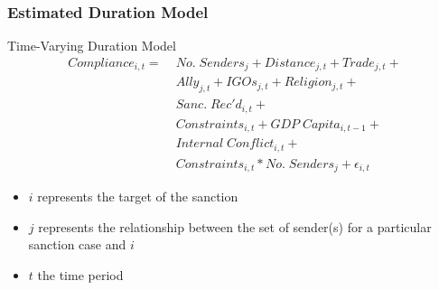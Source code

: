 \begin{frame}
\frametitle{Estimated Duration Model}

\begin{block}{Time-Varying Duration Model}
	\begin{align*}
		Compliance_{i,t} =\; & No. \; Senders_{j} + Distance_{j,t} + Trade_{j,t}  + \\
		 &Ally_{j,t} + IGOs_{j,t} + Religion_{j,t} +\\
 		 &Sanc. \; Rec'd_{i,t} + \\
		 &Constraints_{i,t} + GDP \; Capita_{i,t-1} +\\
		 & Internal \; Conflict_{i,t} +\\
		 &Constraints_{i,t}*No. \; Senders_{j} + \epsilon_{i,t}
	\end{align*}
\end{block}

\begin{itemize}
	\item $i$ represents the target of the sanction
	\item $j$ represents the relationship between the set of sender(s) for a particular sanction case and $i$
	\item $t$ the time period
\end{itemize}

\end{frame}

